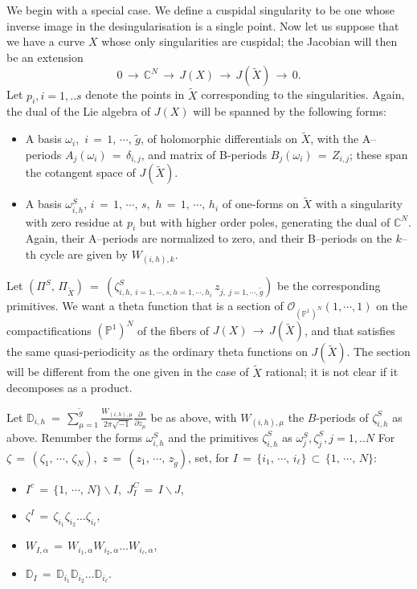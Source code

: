 \documentclass[12pt,reqno]{amsart}
\numberwithin{equation}{section}
\theoremstyle{definition}
\theoremstyle{remark}
\def\bC{{\mathbb {C}}}
\def\bP{{\mathbb {P}}}
\def\bD{{\mathbb {D}}}
\def\bD{{\mathbb {D}}}
\def\pO{{\mathcal O}}
\begin{document}
We begin with a special case. We define a cuspidal singularity to be one whose inverse image in the desingularisation is a single point.
Now let us suppose that we have a curve $X$ whose only singularities are cuspidal;  the Jacobian will then be an extension 
$$0\,\longrightarrow\, \bC^N\,\longrightarrow\, J(X)\,\longrightarrow\, J(\widetilde X)\,\longrightarrow\, 0.$$  Let $p_i, i=1,..s$ denote the points in $\widetilde X$ corresponding to the singularities.
Again, the dual of the  Lie algebra of $J(X)$ will be spanned by the following forms: 
\begin{itemize}
\item A basis $\omega_i$,\, $i\,=\,1,\,\cdots ,\,\widetilde g$, of holomorphic differentials on $\widetilde X$, with
the A--periods $A_j(\omega_i) \,=\, \delta_{i,j}$, and matrix of B-periods $B_j(\omega_i) \,=\, Z_{i,j}$; these
span the cotangent space of $J(\widetilde X)$.

\item A basis $\omega^{S}_{i,h},\, i \,=\, 1,\, \cdots,\, s$,\, $h \,= \, 1,\,\cdots ,\, h_i$ of  one-forms on $\widetilde X$ with a singularity with zero residue at  $p_i$ but with higher order 
poles, generating the dual of $ \bC^N$. Again, their A--periods are normalized to zero, and their B--periods on 
the $k$--th cycle are given by $W_{(i,h),k}$.  
\end{itemize}
Let $(\Pi^S,\, \Pi_{\widetilde X}) \ =\ (\zeta^S_{i,h, \ i =1,\cdots ,s, h = 1,\cdots ,h_i}\, z_{j,\ j= 1,
\cdots ,{\widetilde g}})$
be the corresponding primitives. We 
want a theta function that is a section of ${\pO}_{(\bP^1)^N}(1,\cdots ,1)$ on the compactifications $(\bP^1)^N$
of the fibers of 
$J(X)\,\longrightarrow \,J(\widetilde X)$, and that satisfies the same quasi-periodicity as the ordinary theta
functions on $J(\widetilde X)$. The section will be different from the one given in the case of $\widetilde X$ rational; it is not clear if it decomposes as a product.

Let $\bD_{i,h}\  =\, \sum_{\mu = 1}^{\widetilde g} \frac{W_{(i,h),\mu} }{2\pi\sqrt{-1}}\frac{\partial}{\partial z_\mu}$
be as above, with $W_{(i,h),\mu}$ the $B$-periods of $\zeta^S_{i,h}$ as above. Renumber the forms $\omega^S_{i,h}$ and the primitives $\zeta^S_{i,h}$ as $\omega^S_j,  \zeta^S_j, j= 1,..N$
For $\zeta \,=\, (\zeta_1,\,\cdots ,\,\zeta_N)$,\, $z\,=\, (z_1,\,\cdots ,\, z_{\widetilde g})$,
set, for $I\,=\,\{i_1,\,\cdots ,\, i_\ell\}\,\subset\,\{1,\, \cdots ,\, N\}$:
\begin{itemize} 
\item $I^c\, =\, \{1,\, \cdots ,\, N\}\backslash I$,\, $J_I^C\, =\, I\backslash J$,
\item $\zeta^I \,=\, \zeta_{i_1}\zeta_{i_2}\ldots \zeta_{i_\ell}$,
\item $W_{ I,\alpha}\, =\, W_{ i_1,\alpha}W_{ i_2,\alpha}\ldots W_{ i_\ell,\alpha}$,
\item $\bD_I \,=\, \bD_{i_1}\bD_{i_2}\ldots \bD_{i_\ell}$.
\end{itemize}
\end{document}
